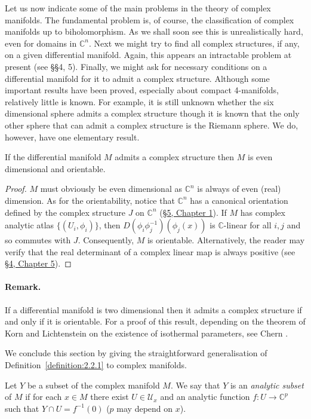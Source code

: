 Let us now indicate some of the main problems in the theory of complex manifolds. The fundamental problem is, of course, the classification of complex manifolds up to biholomorphism. As we shall soon see this is unrealistically hard, even for domains in $\mathbb C^n$. Next we might try to find all complex structures, if any, on a given differential manifold. Again, this appears an intractable problem at present (see \S\S4, 5). Finally, we might ask for necessary conditions on a differential manifold for it to admit a complex structure. Although some important results have been proved, especially about compact 4-manifolds, relatively little is known. For example, it is still unknown whether the six dimensional sphere admits a complex structure though it is known that the only other sphere that can admit a complex structure is the Riemann sphere. We do, however, have one elementary result.

 If the differential manifold $M$ admits a complex structure then $M$ is even dimensional and orientable.
\begin{proof}
$M$ must obviously be even dimensional as $\mathbb C^n$ is always of even (real) dimension. As for the orientability, notice that $\mathbb C^n$ has a canonical orientation defined by the complex structure $J$ on $\mathbb C^n$ (\hyperref[sec:1:5]{\S5, Chapter 1}). If $M$ has complex analytic atlas $\{(U_i,\phi_i)\}$, then $D(\phi_i\phi_j^{-1})(\phi_j(x))$ is $\mathbb C$-linear for all $i,j$ and so commutes with $J$. Consequently, $M$ is orientable. Alternatively, the reader may verify that the real determinant of a complex linear map is always positive (see \hyperref[sec:5:4]{\S4, Chapter 5}).
\end{proof}
\paragraph*{Remark.} If a differential manifold is two dimensional then it admits a complex structure if and only if it is orientable. For a proof of this result, depending on the theorem of Korn and Lichtenstein on the existence of isothermal parameters, see Chern \cite{bib:I:chern-s-s:1}.

We conclude this section by giving the straightforward generalisation of Definition~\ref{definition:2.2.1} to complex manifolds.

 Let $Y$ be a subset of the complex manifold $M$. We say that $Y$ is an \emph{analytic subset} of $M$ if for each $x\in M$ there exist $U\in\mathcal U_x$ and an analytic function $f:U\longrightarrow\mathbb C^p$ such that $Y\cap U=f^{-1}(0)$ ($p$ may depend on $x$).

